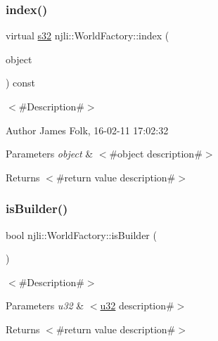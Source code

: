\subsubsection{\texorpdfstring{index()}{index()}}
{\footnotesize\ttfamily virtual \mbox{\hyperlink{_util_8h_aa62c75d314a0d1f37f79c4b73b2292e2}{s32}} njli\+::\+World\+Factory\+::index (\begin{DoxyParamCaption}\item[{\mbox{\hyperlink{classnjli_1_1_abstract_factory_object}{Abstract\+Factory\+Object}} $\ast$}]{object }\end{DoxyParamCaption}) const\hspace{0.3cm}{\ttfamily [virtual]}}



$<$\#\+Description\#$>$ 

\begin{DoxyAuthor}{Author}
James Folk, 16-\/02-\/11 17\+:02\+:32
\end{DoxyAuthor}

\begin{DoxyParams}{Parameters}
{\em object} & $<$\#object description\#$>$\\
\hline
\end{DoxyParams}
\begin{DoxyReturn}{Returns}
$<$\#return value description\#$>$ 
\end{DoxyReturn}
\mbox{\label{classnjli_1_1_world_factory_a3d793e4bc22b7a72b733d62c6241c62f}} 
\subsubsection{\texorpdfstring{is\+Builder()}{isBuilder()}}
{\footnotesize\ttfamily bool njli\+::\+World\+Factory\+::is\+Builder (\begin{DoxyParamCaption}\item[{\mbox{\hyperlink{_util_8h_a10e94b422ef0c20dcdec20d31a1f5049}{u32}}}]{ }\end{DoxyParamCaption})}

$<$\#\+Description\#$>$


\begin{DoxyParams}{Parameters}
{\em u32} & $<$\mbox{\hyperlink{_util_8h_a10e94b422ef0c20dcdec20d31a1f5049}{u32}} description\#$>$\\
\hline
\end{DoxyParams}
\begin{DoxyReturn}{Returns}
$<$\#return value description\#$>$ 
\end{DoxyReturn}
\mbox{\label{classnjli_1_1_world_factory_a38a7c0c129af416254dc132a613d19a9}} 
